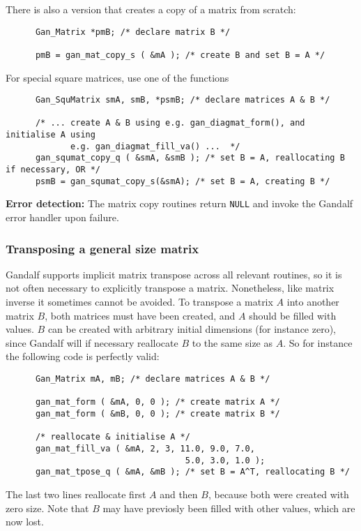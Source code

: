 There is also a version that creates a copy of a matrix from scratch:
\begin{verbatim}
      Gan_Matrix *pmB; /* declare matrix B */

      pmB = gan_mat_copy_s ( &mA ); /* create B and set B = A */
\end{verbatim}

For special square matrices, use one of the functions
\begin{verbatim}
      Gan_SquMatrix smA, smB, *psmB; /* declare matrices A & B */

      /* ... create A & B using e.g. gan_diagmat_form(), and initialise A using
             e.g. gan_diagmat_fill_va() ...  */
      gan_squmat_copy_q ( &smA, &smB ); /* set B = A, reallocating B if necessary, OR */
      psmB = gan_squmat_copy_s(&smA); /* set B = A, creating B */
\end{verbatim}

{\bf Error detection:} The matrix copy routines return {\tt NULL} and
invoke the Gandalf error handler upon failure.

\subsubsection{Transposing a general size matrix}
Gandalf supports implicit matrix transpose across all relevant routines,
so it is not often necessary to explicitly transpose a matrix.
Nonetheless, like matrix inverse it sometimes cannot be avoided.
To transpose a matrix $A$ into another matrix $B$, both matrices must have
been created, and $A$ should be filled with values. $B$ can be
created with arbitrary initial dimensions (for instance zero),
since Gandalf will
if necessary reallocate $B$ to the same size as $A$.
So for instance the following code is perfectly valid:
\begin{verbatim}
      Gan_Matrix mA, mB; /* declare matrices A & B */

      gan_mat_form ( &mA, 0, 0 ); /* create matrix A */
      gan_mat_form ( &mB, 0, 0 ); /* create matrix B */

      /* reallocate & initialise A */
      gan_mat_fill_va ( &mA, 2, 3, 11.0, 9.0, 7.0,
                                    5.0, 3.0, 1.0 );
      gan_mat_tpose_q ( &mA, &mB ); /* set B = A^T, reallocating B */
\end{verbatim}
The last two lines reallocate first $A$ and then $B$, because both
were created with zero size. Note that $B$ may have previosly been
filled with other values, which are now lost.

